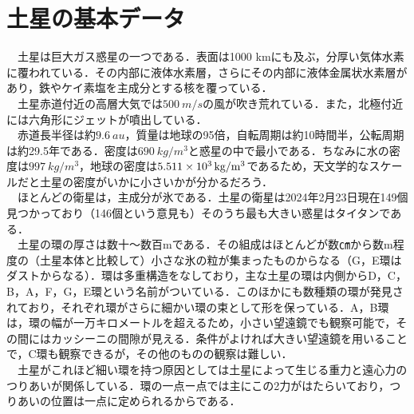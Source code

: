 \documentclass[../main]{subfiles}
\begin{document}
\section{土星の基本データ}
　土星は巨大ガス惑星の一つである．表面は1000 kmにも及ぶ，分厚い気体水素に覆われている．その内部に液体水素層，さらにその内部に液体金属状水素層があり，鉄やケイ素塩を主成分とする核を覆っている．\\
　土星赤道付近の高層大気では$\SI[mode=text]{500}{m/s}$の風が吹き荒れている．また，北極付近には六角形にジェットが噴出している．\\
　赤道長半径は約$\SI[mode=text]{9.6}{au}$，質量は地球の95倍，自転周期は約10時間半，公転周期は約29.5年である．密度は$\SI[mode=text]{690}{kg/m^3}$と惑星の中で最小である．ちなみに水の密度は$\SI[mode=text]{997}{kg/m^3}$，地球の密度は$\SI[mode=text]{5.511E3}{kg/m^3}$であるため，天文学的なスケールだと土星の密度がいかに小さいかが分かるだろう．\\
　ほとんどの衛星は，主成分が氷である．土星の衛星は2024年2月23日現在149個見つかっており（146個という意見も）そのうち最も大きい惑星はタイタンである．\\
　土星の環の厚さは数十〜数百mである．その組成はほとんどが数㎝から数m程度の（土星本体と比較して）小さな氷の粒が集まったものからなる（G，E環はダストからなる）．環は多重構造をなしており，主な土星の環は内側からD，C，B，A，F，G，E環という名前がついている．このほかにも数種類の環が発見されており，それぞれ環がさらに細かい環の束として形を保っている．A，B環は，環の幅が一万キロメートルを超えるため，小さい望遠鏡でも観察可能で，その間にはカッシーニの間隙が見える．条件がよければ大きい望遠鏡を用いることで，C環も観察できるが，その他のものの観察は難しい．\\
　土星がこれほど細い環を持つ原因としては土星によって生じる重力と遠心力のつりあいが関係している．環の一点ー点では主にこの2力がはたらいており，つりあいの位置は一点に定められるからである．
\end{document}
